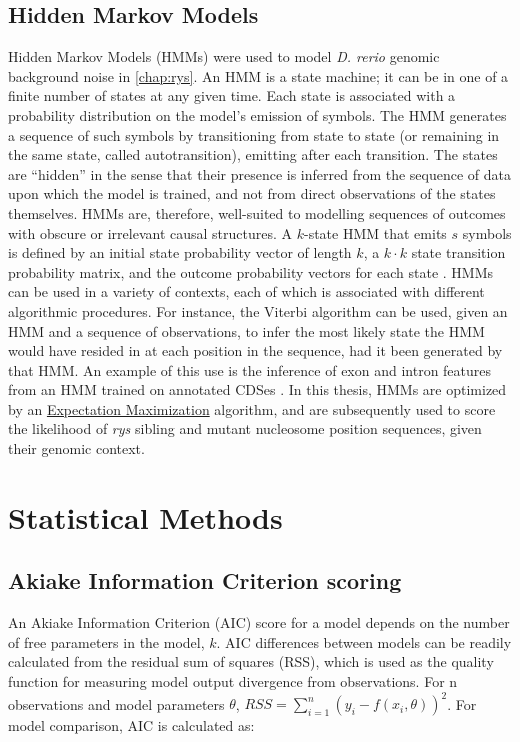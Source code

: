 \subsection{Hidden Markov Models}
\label{ssec:HMM}
Hidden Markov Models (HMMs) were used to model \textit{D. rerio} genomic background noise in \autoref{chap:rys}. An HMM is a state machine; it can be in one of a finite number of states at any given time. Each state is associated with a probability distribution on the model's emission of symbols. The HMM generates a sequence of such symbols by transitioning from state to state (or remaining in the same state, called autotransition), emitting after each transition. The states are ``hidden'' in the sense that their presence is inferred from the sequence of data upon which the model is trained, and not from direct observations of the states themselves. HMMs are, therefore, well-suited to modelling sequences of outcomes with obscure or irrelevant causal structures. A $k$-state HMM that emits $s$ symbols is defined by an initial state probability vector of length $k$, a $k\cdot k$ state transition probability matrix, and the outcome probability vectors for each state \cite{Rabiner1989}. HMMs can be used in a variety of contexts, each of which is associated with different algorithmic procedures. For instance, the Viterbi algorithm can be used, given an HMM and a sequence of observations, to infer the most likely state the HMM would have resided in at each position in the sequence, had it been generated by that HMM. An example of this use is the inference of exon and intron features from an HMM trained on annotated CDSes \cite{Henderson1997}. In this thesis, HMMs are optimized by an \hyperref[ssec:EM]{Expectation Maximization} algorithm, and are subsequently used to score the likelihood of \textit{rys} sibling and mutant nucleosome position sequences, given their genomic context.

\section{Statistical Methods}

\subsection{Akiake Information Criterion scoring}
\label{ssec:AIC}
An Akiake Information Criterion (AIC) score for a model depends on the number of free parameters in the model, $k$. AIC differences between models can be readily calculated from the residual sum of squares (RSS), which is used as the quality function for measuring model output divergence from observations. For n observations and model parameters $\theta$, $RSS = \sum_{i=1}^{n}(y_i-f(x_i,\theta))^2$. For model comparison, AIC is calculated as:

